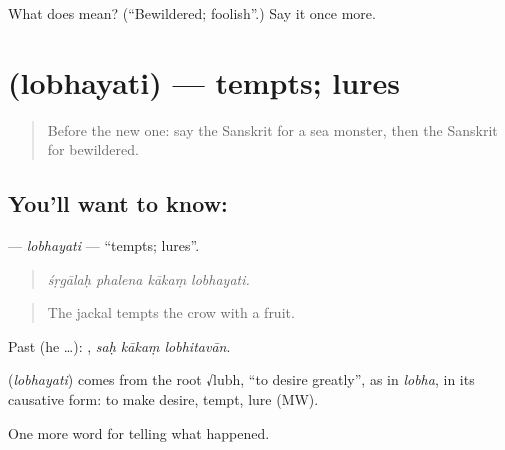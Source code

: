 \begin{tcolorbox}[breakable,colback=teal!4,colframe=teal!35!black,title={Before you move on}]
What does  mean? (\textquotedblleft{}Bewildered; foolish\textquotedblright{}.) Say it once more.
\end{tcolorbox}
\section[\texorpdfstring{\sk{लोभयति} (lobhayati)}{लोभयति (lobhayati)}]{ (lobhayati) — tempts; lures}

\label{lesson:SA-C336-lobhayati}



\begin{quote}
Before the new one: say the Sanskrit for a sea monster, then the Sanskrit for bewildered.
\end{quote}

\subsection*{You'll want to know: }
\textbf{} — \emph{lobhayati} — \textquotedblleft{}tempts; lures\textquotedblright{}.

\begin{quote}
   
\end{quote}

\begin{quote}
\emph{śṛgālaḥ phalena kākaṃ lobhayati.}
\end{quote}

\begin{quote}
The jackal tempts the crow with a fruit.
\end{quote}

Past (he …):   , \emph{saḥ kākaṃ lobhitavān}.

\begin{cousinweb}
\textbf{} (\emph{lobhayati}) comes from the root √lubh, \textquotedblleft{}to desire greatly\textquotedblright{}, as in \emph{lobha}, in its causative form: to make desire, tempt, lure (MW).
\end{cousinweb}

\begin{grammarlens}[title={What you've built}]
One more word for telling what happened.
\end{grammarlens}


